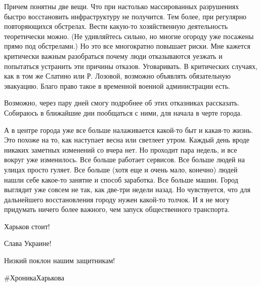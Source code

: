 Причем понятны две вещи. Что при настолько массированных разрушениях быстро
восстановить инфраструктуру не получится. Тем более, при регулярно
повторяющихся обстрелах. Вести какую-то хозяйственную деятельность теоретически
можно. (Не удивляйтесь сильно, но многие огороду уже посажены прямо под
обстрелами.) Но это все многократно повышает риски. Мне кажется критически
важным разобраться почему люди отказываются уезжать и попытаться устранить эти
причины отказов. Уговаривать. В критических случаях, как в том же Слатино или
Р. Лозовой, возможно объявлять обязательную эвакуацию. Благо право такое в
временной военной администрации есть.

Возможно, через пару дней смогу подробнее об этих отказниках рассказать.
Собираюсь в ближайшие дни пообщаться с ними, для начала в черте города.

А в центре города уже все больше налаживается какой-то быт и какая-то жизнь.
Это похоже на то, как наступает весна или светлеет утром. Каждый день вроде
никаких заметных изменений со вчера нет. Но проходит пара недель, и все вокруг
уже изменилось. Все больше работает сервисов. Все больше людей на улицах просто
гуляет. Все больше (хотя еще и очень мало, конечно) людей нашли себе какое-то
занятие и способ заработка. Все больше машин. Город выглядит уже совсем не так,
как две-три недели назад. Но чувствуется, что для дальнейшего восстановления
городу нужен какой-то толчок. И я не могу придумать ничего более важного, чем
запуск общественного транспорта.

Харьков стоит!

Слава Украине!

Низкий поклон нашим защитникам!

\#ХроникаХарькова


